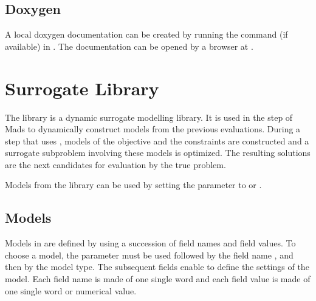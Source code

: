 \documentclass[letterpaper,10pt,english]{sphinxmanual}
\begin{document}
\section{Doxygen}
\label{\detokenize{AdvancedFunctionalities:doxygen}}
\sphinxAtStartPar
A local doxygen documentation can be created by running the  command (if available) in . The documentation can be opened by a browser at .

\begin{sphinxShadowBox}
\end{sphinxShadowBox}


\chapter{Surrogate Library}
\label{\detokenize{SgteLib:surrogate-library}}\label{\detokenize{SgteLib:sgtelib}}\label{\detokenize{SgteLib::doc}}
\sphinxAtStartPar
The  library is a dynamic surrogate modelling library. It is used in the  step of Mads to dynamically construct models from the previous evaluations.
During a  step that uses , models of the objective and the constraints are constructed and a surrogate subproblem involving these models is optimized.
The resulting solutions are the next candidates for evaluation by the true problem.

\begin{DUlineblock}{0em}
\item[] Models from the  library can be used by setting the parameter  to  or .
\end{DUlineblock}


\section{Models}
\label{\detokenize{SgteLib:models}}
\sphinxAtStartPar
Models in  are defined by using a succession of field names and field values.
To choose a model, the parameter  must be used followed by the field name , and then by the model type.
The subsequent fields enable to define the settings of the model.
Each field name is made of one single word and each field value is made of one single word or numerical value.
\end{document}
